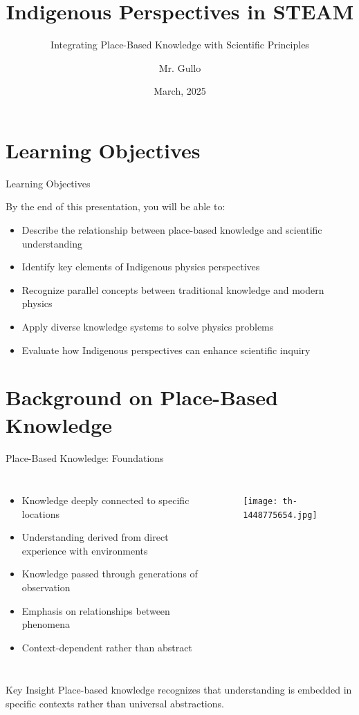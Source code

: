 \documentclass{beamer}
\title[Place-Based Knowledge]{Indigenous Perspectives in STEAM}
\subtitle{Integrating Place-Based Knowledge with Scientific Principles}
\author[Mr. Gullo]{Mr. Gullo}
\institute{Physics Department}
\date[March 2025]{March, 2025}
\begin{document}
\begin{frame}
    \titlepage
\end{frame}

\section{Learning Objectives}

\begin{frame}{Learning Objectives}
    \begin{block}{By the end of this presentation, you will be able to:}
        \begin{itemize}
            \item Describe the relationship between place-based knowledge and scientific understanding
            \item Identify key elements of Indigenous physics perspectives
            \item Recognize parallel concepts between traditional knowledge and modern physics
            \item Apply diverse knowledge systems to solve physics problems
            \item Evaluate how Indigenous perspectives can enhance scientific inquiry
        \end{itemize}
    \end{block}
\end{frame}



\section{Background on Place-Based Knowledge}

\begin{frame}{Place-Based Knowledge: Foundations}
    \begin{columns}
        \begin{itemize}
            \item Knowledge deeply connected to specific locations
            \item Understanding derived from direct experience with environments
            \item Knowledge passed through generations of observation
            \item Emphasis on relationships between phenomena
            \item Context-dependent rather than abstract
        \end{itemize}
        
        \begin{figure}
            \centering
            \texttt{[image: th-1448775654.jpg]}
        \end{figure}
    \end{columns}
    
    \begin{alertblock}{Key Insight}
        Place-based knowledge recognizes that understanding is embedded in specific contexts rather than universal abstractions.
    \end{alertblock}
\end{frame}
\end{document}
